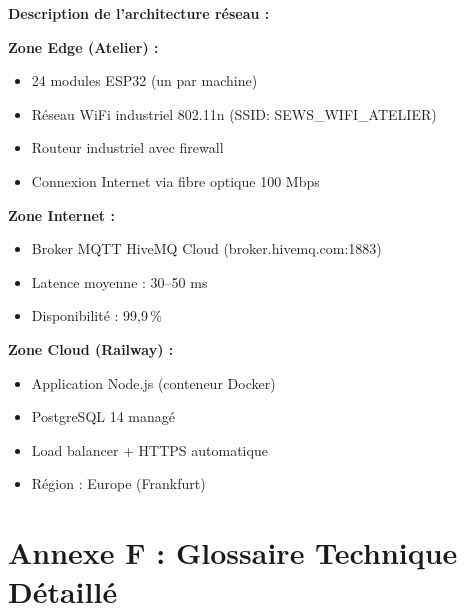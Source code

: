 \textbf{Description de l'architecture réseau :}

\textbf{Zone Edge (Atelier) :}
\begin{itemize}
    \item 24 modules ESP32 (un par machine)
    \item Réseau WiFi industriel 802.11n (SSID: SEWS\_WIFI\_ATELIER)
    \item Routeur industriel avec firewall
    \item Connexion Internet via fibre optique 100 Mbps
\end{itemize}

\textbf{Zone Internet :}
\begin{itemize}
    \item Broker MQTT HiveMQ Cloud (broker.hivemq.com:1883)
    \item Latence moyenne : 30--50 ms
    \item Disponibilité : 99,9\,\%
\end{itemize}

\textbf{Zone Cloud (Railway) :}
\begin{itemize}
    \item Application Node.js (conteneur Docker)
    \item PostgreSQL 14 managé
    \item Load balancer + HTTPS automatique
    \item Région : Europe (Frankfurt)
\end{itemize}

\section{Annexe F : Glossaire Technique Détaillé}

